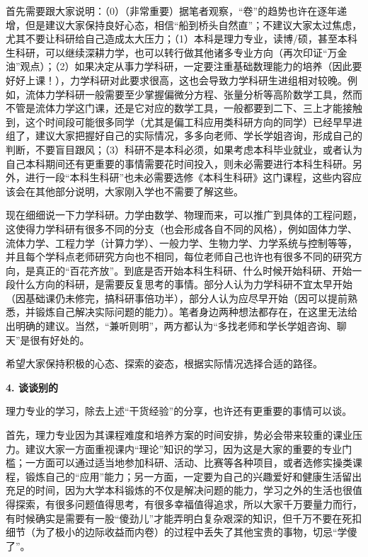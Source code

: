 \vspace{10pt}

首先需要跟大家说明：（0）（非常重要）据笔者观察，“卷”的趋势也许在逐年递增，但是建议大家保持良好心态，相信“船到桥头自然直”；不建议大家太过焦虑，尤其不要让科研给自己造成太大压力；（1）本科是理力专业，读博/硕，甚至本科生科研，可以继续深耕力学，也可以转行做其他诸多专业方向（再次印证“万金油”观点）；（2）如果决定从事力学科研，一定要注重基础数理能力的培养（因此要好好上课！），力学科研对此要求很高，这也会导致力学科研生进组相对较晚。例如，流体力学科研一般需要至少掌握偏微分方程、张量分析等高阶数学工具，然而不管是流体力学这门课，还是它对应的数学工具，一般都要到二下、三上才能接触到，这个时间段可能很多同学（尤其是偏工科应用类科研方向的同学）已经早早进组了，建议大家把握好自己的实际情况，多多向老师、学长学姐咨询，形成自己的判断，不要盲目跟风；（3）科研不是本科必须，如果考虑本科毕业就业，或者认为自己本科期间还有更重要的事情需要花时间投入，则未必需要进行本科生科研。另外，进行一段“本科生科研”也未必需要选修《本科生科研》这门课程，这些内容应该会在其他部分说明，大家刚入学也不需要了解这些。

\vspace{10pt}

现在细细说一下力学科研。力学由数学、物理而来，可以推广到具体的工程问题，这使得力学科研有很多不同的分支（也会形成各自不同的风格），例如固体力学、流体力学、工程力学（计算力学）、一般力学、生物力学、力学系统与控制等等，并且每个学科点老师研究方向也不相同，每位老师自己也许也有很多不同的研究方向，是真正的“百花齐放”。到底是否开始本科生科研、什么时候开始科研、开始一段什么方向的科研，是需要反复思考的事情。部分人认为力学科研不宜太早开始（因基础课仍未修完，搞科研事倍功半），部分人认为应尽早开始（因可以提前熟悉，并锻炼自己解决实际问题的能力）。笔者身边两种想法都存在，在这里无法给出明确的建议。当然，“兼听则明”，两方都认为“多找老师和学长学姐咨询、聊天”是很有好处的。

\vspace{10pt}

希望大家保持积极的心态、探索的姿态，根据实际情况选择合适的路径。

\vspace{10pt}

\textbf{4. 谈谈别的}

理力专业的学习，除去上述“干货经验”的分享，也许还有更重要的事情可以谈。

\vspace{10pt}

首先，理力专业因为其课程难度和培养方案的时间安排，势必会带来较重的课业压力。建议大家一方面重视课内“理论”知识的学习，因为这是大家的重要的专业门槛；一方面可以通过适当地参加科研、活动、比赛等各种项目，或者选修实操类课程，锻炼自己的“应用”能力；另一方面，一定要为自己的兴趣爱好和健康生活留出充足的时间，因为大学本科锻炼的不仅是解决问题的能力，学习之外的生活也很值得探索，有很多问题值得思考，有很多幸福值得追求，所以大家千万要量力而行，有时候确实是需要有一股“傻劲儿”才能弄明白复杂艰深的知识，但千万不要在死扣细节（为了极小的边际收益而内卷）的过程中丢失了其他宝贵的事物，切忌“学傻了”。

